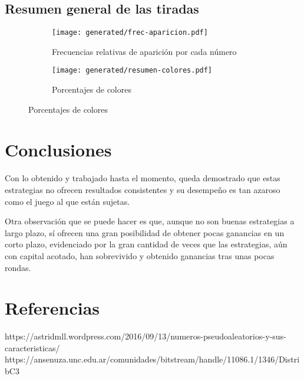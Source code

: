 \documentclass{article}
\begin{document}
  \subsection{Resumen general de las tiradas}
  \begin{figure}[H]
    \centering
    \begin{subfigure}{0.5\textwidth}
      \centering
      \texttt{[image: generated/frec-aparicion.pdf]}
      \caption{Frecuencias relativas de aparición por cada número}
    \end{subfigure}%
    \begin{subfigure}{0.5\textwidth}
      \centering
      \texttt{[image: generated/resumen-colores.pdf]}
      \caption{Porcentajes de colores}
    \end{subfigure}
  \end{figure}

\section{Conclusiones}

    Con lo obtenido y trabajado hasta el momento, queda demostrado que estas estrategias no ofrecen resultados
    consistentes y su desempeño es tan azaroso como el juego al que están sujetas.

    Otra observación que se puede hacer es que, aunque no son buenas estrategias a largo plazo, sí ofrecen una gran
    posibilidad de obtener pocas ganancias en un corto plazo, evidenciado por la gran cantidad de veces que las
    estrategias, aún con capital acotado, han sobrevivido y obtenido ganancias tras unas pocas rondas.


\section{Referencias}
  \label{sec:referencias}
    https://astridmll.wordpress.com/2016/09/13/numeros-pseudoaleatorios-y-sus-caracteristicas/
    https://ansenuza.unc.edu.ar/comunidades/bitstream/handle/11086.1/1346/DistribC3%
\end{document}
